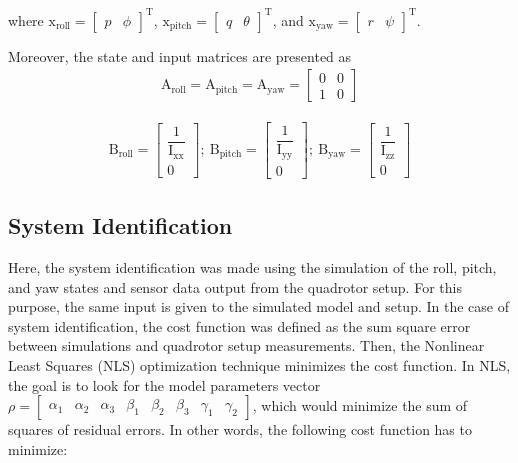 \documentclass[3p,times]{elsarticle}
\begin{document}
where $\boldsymbol{\mathrm{x}}_{\text{roll}} = \begin{bmatrix}
	p & \phi
\end{bmatrix}^\mathrm{T}$, $\boldsymbol{\mathrm{x}}_{\text{pitch}} = \begin{bmatrix}
	q & \theta \end{bmatrix}^\mathrm{T}$, and $\boldsymbol{\mathrm{x}}_{\text{yaw}} = \begin{bmatrix}
	r & \psi
\end{bmatrix}^\mathrm{T}$.



Moreover, the state and input matrices are presented as
\begin{equation}
	\begin{split}
		\boldsymbol{\mathrm{A}}_{\text{roll}}  =\boldsymbol{\mathrm{A}}_{\text{pitch}}  = \boldsymbol{\mathrm{A}}_{\text{yaw}}  = \begin{bmatrix}
			0 & 0\\
			1 & 0
		\end{bmatrix}
	\end{split}
\end{equation}

\begin{equation}
	\begin{split}
		\boldsymbol{\mathrm{B}}_{\text{roll}}  = \begin{bmatrix}
			\dfrac{1}{\mathrm{I}_{\text{xx}}}
			\\[1em]
			0
		\end{bmatrix};~ \boldsymbol{\mathrm{B}}_{\text{pitch}}  = \begin{bmatrix}
			\dfrac{1}{\mathrm{I}_{\text{yy}}}
			\\[1em]
			0
		\end{bmatrix};~ \boldsymbol{\mathrm{B}}_{\text{yaw}}  = \begin{bmatrix}
			\dfrac{1}{\mathrm{I}_{\text{zz}}}
			\\[1em]
			0
		\end{bmatrix}
	\end{split}
\end{equation}

\subsection{System Identification}

\noindent Here, the system identification was made using the simulation of the roll, pitch, and yaw states and sensor data output from the quadrotor setup. For this purpose, the same input is given to the simulated model and setup. In the case of system identification, the cost function was defined as the sum square error between simulations and quadrotor setup measurements. Then, the Nonlinear Least Squares (NLS)  optimization technique minimizes the cost function. In NLS, the goal is to look for the model parameters vector $
\rho = \begin{bmatrix}
    \alpha_1 & \alpha_2 & \alpha_3 & \beta_1 & \beta_2 & \beta_3 & \gamma_1 & \gamma_2
\end{bmatrix}
$, which would minimize the sum of squares of residual errors. In other words, the following cost function has to minimize:
\end{document}
